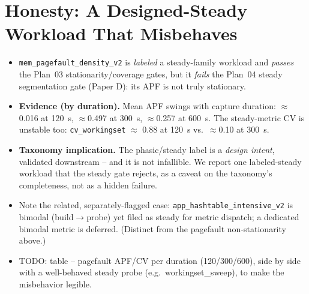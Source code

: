 \documentclass[conference]{IEEEtran}
\begin{document}
\section{Honesty: A Designed-Steady Workload That Misbehaves}
\label{sec:honesty}
\begin{itemize}
  \item \texttt{mem\_pagefault\_density\_v2} is \emph{labeled} a steady-family
        workload and \emph{passes} the Plan~03 stationarity/coverage gates, but
        it \emph{fails} the Plan~04 steady segmentation gate (Paper D): its APF
        is not truly stationary.
  \item \textbf{Evidence (by duration).} Mean APF swings with capture duration:
        $\approx$\num{0.016} at \SI{120}{\second}, $\approx$\num{0.497} at
        \SI{300}{\second}, $\approx$\num{0.257} at \SI{600}{\second}. The
        steady-metric CV is unstable too: \texttt{cv\_workingset} $\approx$
        \num{0.88} at \SI{120}{\second} vs.\ $\approx$\num{0.10} at
        \SI{300}{\second}.
  \item \textbf{Taxonomy implication.} The phasic/steady label is a
        \emph{design intent}, validated downstream -- and it is not infallible.
        We report one labeled-steady workload that the steady gate rejects, as
        a caveat on the taxonomy's completeness, not as a hidden failure.
  \item Note the related, separately-flagged case:
        \texttt{app\_hashtable\_intensive\_v2} is bimodal (build$\to$probe) yet
        filed as steady for metric dispatch; a dedicated bimodal metric is
        deferred. (Distinct from the pagefault non-stationarity above.)
  \item TODO: table -- pagefault APF/CV per duration (120/300/600), side by side
        with a well-behaved steady probe (e.g.\ workingset\_sweep), to make the
        misbehavior legible.
\end{itemize}

\end{document}
